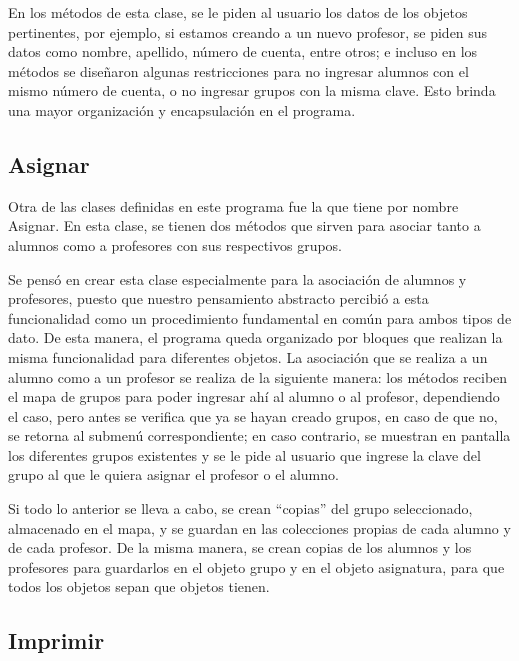 \documentclass[11pt]{article}
\begin{document}
En los métodos de esta clase, se le piden al usuario los datos de los 
objetos pertinentes, por ejemplo, si estamos creando a un nuevo 
profesor, se piden sus datos como nombre, apellido, número de cuenta, 
entre otros; e incluso en los métodos se diseñaron algunas 
restricciones para no ingresar alumnos con el mismo número de cuenta, 
o no ingresar grupos con la misma clave. Esto brinda una mayor 
organización y encapsulación en el programa.

\subsection{Asignar}

\par

Otra de las clases definidas en este programa fue la que tiene por 
nombre Asignar. En esta clase, se tienen dos métodos que sirven para 
asociar tanto a alumnos como a profesores con sus respectivos grupos.

\par

Se pensó en crear esta clase especialmente para la asociación de 
alumnos y profesores, puesto que nuestro pensamiento abstracto 
percibió a esta funcionalidad como un procedimiento fundamental en 
común para ambos tipos de dato. De esta manera, el programa queda 
organizado por bloques que realizan la misma funcionalidad para 
diferentes objetos. La asociación que se realiza a un alumno como a 
un profesor se realiza de la siguiente manera: los métodos reciben el 
mapa de grupos para poder ingresar ahí al alumno o al profesor, 
dependiendo el caso, pero antes se verifica que ya se hayan creado 
grupos, en caso de que no, se retorna al submenú correspondiente; en 
caso contrario, se muestran en pantalla los diferentes grupos 
existentes y se le pide al usuario que ingrese la clave del grupo al 
que le quiera asignar el profesor o el alumno.

\par

Si todo lo anterior se lleva a cabo, se crean “copias” del grupo 
seleccionado, almacenado en el mapa, y se guardan en las colecciones 
propias de cada alumno y de cada profesor. De la misma manera, se 
crean copias de los alumnos y los profesores para guardarlos en el 
objeto grupo y en el objeto asignatura, para que todos los objetos 
sepan que objetos tienen.
\subsection{Imprimir}
\par
\end{document}
